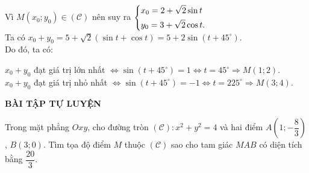 \begin{vd}
{\begin{enumerate}
			Vì $M(x_0;y_0) \in \mathscr{(C)}$ nên suy ra $\left\{\begin{aligned}&x_0=2+\sqrt{2}\sin t\\ &y_0=3+\sqrt{2}\cos t.\end{aligned}\right.$\\
			Ta có $x_0 + y_0 = 5+\sqrt{2}(\sin t + \cos t) = 5+2\sin (t+45^\circ)$.\\
			Do đó, ta có:
			\begin{center}
				$x_0 + y_0 $ đạt giá trị lớn nhất $\Leftrightarrow \sin (t+45^\circ)=1 \Leftrightarrow t=45^\circ \Rightarrow M(1;2)$.\\
				$x_0 + y_0 $ đạt giá trị nhỏ nhất $\Leftrightarrow \sin (t+45^\circ)=-1 \Leftrightarrow t=225^\circ \Rightarrow M(3;4)$.
			\end{center}
		\end{enumerate}
	}
\end{vd}
\begin{center}
	\textbf{BÀI TẬP TỰ LUYỆN}
\end{center}
\begin{bt}%
	Trong mặt phẳng $Oxy$, cho đường tròn $\mathscr{(C)}: x^2 + y^2 = 4$ và hai điểm $A\left(1;-\dfrac{8}{3}\right)$, $B(3;0)$. Tìm tọa độ điểm $M$ thuộc $\mathscr{(C)}$ sao cho tam giác $MAB$ có diện tích bằng $\dfrac{20}{3}$.
\end{bt}

